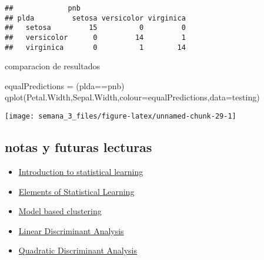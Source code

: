 \documentclass[
]{article}
\newenvironment{Shaded}{\begin{snugshade}}{\end{snugshade}}
\newcommand{\AttributeTok}[1]{\textcolor[rgb]{0.77,0.63,0.00}{#1}}
\newcommand{\FunctionTok}[1]{\textcolor[rgb]{0.00,0.00,0.00}{#1}}
\newcommand{\NormalTok}[1]{#1}
\newcommand{\OtherTok}[1]{\textcolor[rgb]{0.56,0.35,0.01}{#1}}
\newcommand{\SpecialCharTok}[1]{\textcolor[rgb]{0.00,0.00,0.00}{#1}}
\providecommand{\tightlist}{%
  \setlength{\itemsep}{0pt}\setlength{\parskip}{0pt}}
\begin{document}
\begin{verbatim}
##             pnb
## plda         setosa versicolor virginica
##   setosa         15          0         0
##   versicolor      0         14         1
##   virginica       0          1        14
\end{verbatim}

comparacion de resultados

\begin{Shaded}
\begin{Highlighting}[]
\NormalTok{equalPredictions }\OtherTok{=}\NormalTok{ (plda}\SpecialCharTok{==}\NormalTok{pnb)}
\FunctionTok{qplot}\NormalTok{(Petal.Width,Sepal.Width,}\AttributeTok{colour=}\NormalTok{equalPredictions,}\AttributeTok{data=}\NormalTok{testing)}
\end{Highlighting}
\end{Shaded}

\begin{center}\texttt{[image: semana\_3\_files/figure-latex/unnamed-chunk-29-1]} \end{center}

\hypertarget{notas-y-futuras-lecturas}{%
\subsection{notas y futuras lecturas}\label{notas-y-futuras-lecturas}}

\begin{itemize}
\tightlist
\item
  \href{http://www-bcf.usc.edu/~gareth/ISL/}{Introduction to statistical
  learning}
\item
  \href{http://www-stat.stanford.edu/~tibs/ElemStatLearn/}{Elements of
  Statistical Learning}
\item
  \href{http://www.stat.washington.edu/raftery/Research/PDF/fraley2002.pdf}{Model
  based clustering}
\item
  \href{http://en.wikipedia.org/wiki/Linear_discriminant_analysis}{Linear
  Discriminant Analysis}
\item
  \href{http://en.wikipedia.org/wiki/Quadratic_classifier}{Quadratic
  Discriminant Analysis}
\end{itemize}
\end{document}
